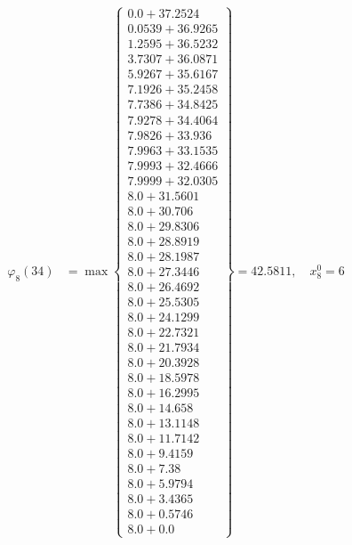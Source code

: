 \documentclass{article}
\begin{document}
\begin{align*}
  
\varphi_{8}(34) &= \max \left\{ \begin{array}{c}
0.0 + 37.2524 \\
 0.0539 + 36.9265 \\
 1.2595 + 36.5232 \\
 3.7307 + 36.0871 \\
 5.9267 + 35.6167 \\
 7.1926 + 35.2458 \\
 7.7386 + 34.8425 \\
 7.9278 + 34.4064 \\
 7.9826 + 33.936 \\
 7.9963 + 33.1535 \\
 7.9993 + 32.4666 \\
 7.9999 + 32.0305 \\
 8.0 + 31.5601 \\
 8.0 + 30.706 \\
 8.0 + 29.8306 \\
 8.0 + 28.8919 \\
 8.0 + 28.1987 \\
 8.0 + 27.3446 \\
 8.0 + 26.4692 \\
 8.0 + 25.5305 \\
 8.0 + 24.1299 \\
 8.0 + 22.7321 \\
 8.0 + 21.7934 \\
 8.0 + 20.3928 \\
 8.0 + 18.5978 \\
 8.0 + 16.2995 \\
 8.0 + 14.658 \\
 8.0 + 13.1148 \\
 8.0 + 11.7142 \\
 8.0 + 9.4159 \\
 8.0 + 7.38 \\
 8.0 + 5.9794 \\
 8.0 + 3.4365 \\
 8.0 + 0.5746 \\
 8.0 + 0.0
\end{array} \right\}=42.5811,\quad x_{8}^0=6\\
  
  
  

\end{align*}
\end{document}
